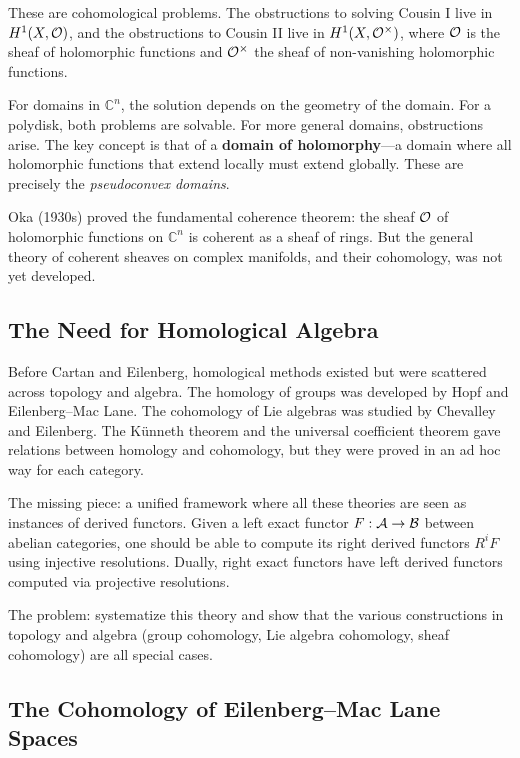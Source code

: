 These are cohomological problems. The obstructions to solving Cousin I live in $H^1(X, \mathcal{O})$, and the obstructions to Cousin II live in $H^1(X, \mathcal{O}^\times)$, where $\mathcal{O}$ is the sheaf of holomorphic functions and $\mathcal{O}^\times$ the sheaf of non-vanishing holomorphic functions.

For domains in $\mathbb{C}^n$, the solution depends on the geometry of the domain. For a polydisk, both problems are solvable. For more general domains, obstructions arise. The key concept is that of a \textbf{domain of holomorphy}---a domain where all holomorphic functions that extend locally must extend globally. These are precisely the \textit{pseudoconvex domains}.

Oka (1930s) proved the fundamental coherence theorem: the sheaf $\mathcal{O}$ of holomorphic functions on $\mathbb{C}^n$ is coherent as a sheaf of rings. But the general theory of coherent sheaves on complex manifolds, and their cohomology, was not yet developed.

\subsection{The Need for Homological Algebra}

Before Cartan and Eilenberg, homological methods existed but were scattered across topology and algebra. The homology of groups was developed by Hopf and Eilenberg--Mac Lane. The cohomology of Lie algebras was studied by Chevalley and Eilenberg. The K{\"u}nneth theorem and the universal coefficient theorem gave relations between homology and cohomology, but they were proved in an ad hoc way for each category.

The missing piece: a unified framework where all these theories are seen as instances of derived functors. Given a left exact functor $F: \mathcal{A} \to \mathcal{B}$ between abelian categories, one should be able to compute its right derived functors $R^i F$ using injective resolutions. Dually, right exact functors have left derived functors computed via projective resolutions.

The problem: systematize this theory and show that the various constructions in topology and algebra (group cohomology, Lie algebra cohomology, sheaf cohomology) are all special cases.

\subsection{The Cohomology of Eilenberg--Mac Lane Spaces}

